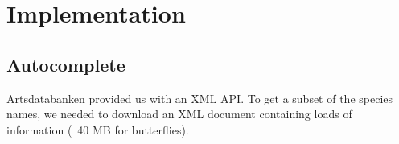 \section{Implementation}

\subsection{Autocomplete}

Artsdatabanken provided us with an XML API. To get a subset of the species names,
we needed to download an XML document containing loads of information (~40 MB for
butterflies).
